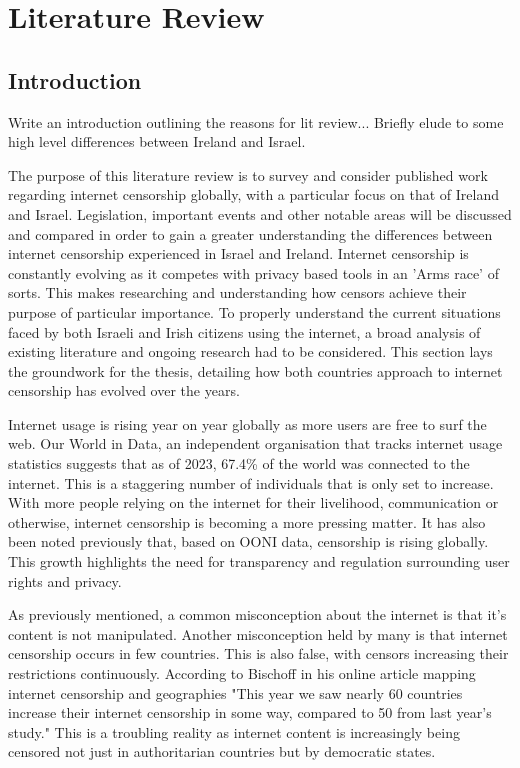 \chapter{Literature Review}

\section{Introduction}

Write an introduction outlining the reasons for lit review... Briefly elude to some high level differences between Ireland and Israel.

The purpose of this literature review is to survey and consider published work regarding internet censorship globally, with a particular focus on that of Ireland and Israel. Legislation, important events and other notable areas will be discussed and compared in order to gain a greater understanding the differences between internet censorship experienced in Israel and Ireland. Internet censorship is constantly evolving as it competes with privacy based tools in an 'Arms race' of sorts. This makes researching and understanding how censors achieve their purpose of particular importance. To properly understand the current situations faced by both Israeli and Irish citizens using the internet, a broad analysis of existing literature and ongoing research had to be considered. This section lays the groundwork for the thesis, detailing how both countries approach to internet censorship has evolved over the years. 

Internet usage is rising year on year globally as more users are free to surf the web. Our World in Data, an independent organisation that tracks internet usage statistics suggests that as of 2023, 67.4\% of the world was connected to the internet. This is a staggering number of individuals that is only set to increase. With more people relying on the internet for their livelihood, communication or otherwise, internet censorship is becoming a more pressing matter. It has also been noted previously that, based on OONI data, censorship is rising globally. This growth highlights the need for transparency and regulation surrounding user rights and privacy. 

As previously mentioned, a common misconception about the internet is that it's content is not manipulated. Another misconception held by many is that internet censorship occurs in few countries. This is also false, with censors increasing their restrictions continuously. According to Bischoff in his online article mapping internet censorship and geographies "This year we saw nearly 60 countries increase their internet censorship in some way, compared to 50 from last year’s study."\cite{bischoff2025internet} This is a troubling reality as internet content is increasingly being censored not just in authoritarian countries but by democratic states. 


